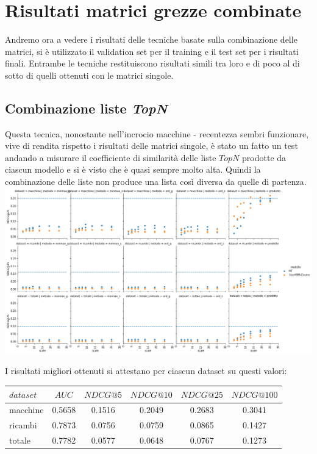 \newpage
\section{Risultati matrici grezze combinate}
Andremo ora a vedere i risultati delle tecniche basate sulla combinazione delle matrici, si è utilizzato il validation set per il training e il test set per i risultati finali.
Entrambe le tecniche restituiscono risultati simili tra loro e di poco al di sotto di quelli ottenuti con le matrici singole. 

\subsection{Combinazione liste \textit{TopN}}
Questa tecnica, nonostante nell'incrocio macchine - recentezza sembri funzionare, vive di rendita rispetto i risultati delle matrici singole, è stato un fatto un test andando a misurare il coefficiente di similarità delle liste $TopN$ prodotte da ciascun modello e si è visto che è quasi sempre molto alta. Quindi la combinazione delle liste non produce una lista così diversa da quelle di partenza.\\

\includegraphics[width=16cm]{figures/comb_1.png}

I risultati migliori ottenuti si attestano per ciascun dataset su questi valori:\\

\begin{tabular}{|l|ccccc|}
    \toprule
    $dataset$ & $AUC$ & $NDCG@5$ & $NDCG@10$  & $NDCG@25$ & $NDCG@100$  \\
    \midrule
    macchine & 0.5658   &0.1516 & 0.2049 & 0.2683 & 0.3041 \\
    ricambi &  0.7873  &0.0756 & 0.0759 & 0.0865 & 0.1427 \\
    totale  & 0.7782   &0.0577 & 0.0648 & 0.0767 & 0.1273 \\
\bottomrule
\end{tabular}\\


